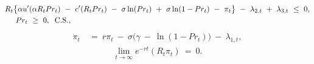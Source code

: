 \begin{equation}
\begin{split}
    & R_{t} \big\{ \alpha u'(\alpha R_{t} Pr_{t}) \ - \ c'(R_{t} Pr_{t}) \ - \ \sigma \ln(Pr_{t}) \ + \ \sigma \ln(1 - Pr_{t}) \ - \ \pi_{t} \big\} \ - \ \lambda_{2,t} \ + \ \lambda_{3,t} \ \leq \ 0, \\
    & \hspace{0.5cm} Pr_{t} \ \geq \ 0,  \hspace{0.2cm} \text{C.S.},
\end{split}
\label{Equation:Social-Planners-Problem_Necessary-Conditions_Drilling-Probability}
\end{equation}
\begin{equation}
\begin{split}
    \dot{\pi}_{t} \ 
    & = \ r \pi_{t} \ - \ \sigma \big( \gamma \ - \ \ln(1 - Pr_{t}) \big) \ - \ \lambda_{1,t},
\end{split}
\label{Equation:Social-Planners-Problem_Necessary-Conditions_Costate-Variable}
\end{equation}
\begin{equation}
\begin{split}
    \lim_{t \rightarrow \infty} e^{-rt} (R_{t} \pi_{t}) \ = \ 0.
\end{split}
\label{Equation:Social-Planners-Problem_Transversality-Condition}
\end{equation}